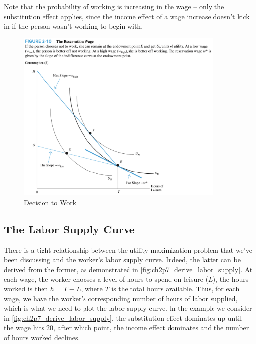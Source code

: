 Note that the probability of working is increasing in the wage -- 
only the substitution effect applies, since the income effect of 
a wage increase doesn't kick in if the person wasn't working to begin with.

\FloatBarrier

\begin{figure}[!htb]
    \centering
        \includegraphics[width=0.9\textwidth]{../input/ch_2p6_work_dec.png}
    \caption{Decision to Work}
    \label{fig:ch2p6_work_dec}
\end{figure}

\FloatBarrier

\subsection{The Labor Supply Curve}

There is a tight relationship between the 
utility maximization problem that we've been 
discussing and the worker's labor supply 
curve. 
Indeed, the latter can be derived from the former,
as demonstrated in \autoref{fig:ch2p7_derive_labor_supply}.
At each wage, the worker chooses a level of 
hours to spend on leisure ($L$), the hours worked is 
then $h = T - L$, where $T$ is the total hours available.
Thus, for each wage, we have the worker's corresponding 
number of hours of labor supplied, which is what we need 
to plot the labor supply curve. 
In the example we consider in 
\autoref{fig:ch2p7_derive_labor_supply}, 
the substitution effect dominates up until 
the wage hits $20$, after which point, the income 
effect dominates and the number of hours worked 
declines.

